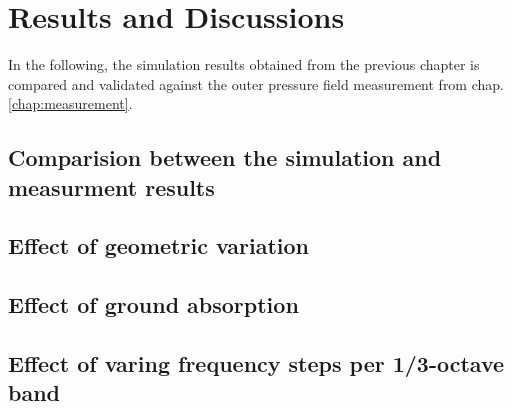\chapter{Results and Discussions}
\label{chap:results}

In the following, the simulation results obtained from the previous chapter is compared and validated against the outer pressure field measurement from chap. \ref{chap:measurement}.

\section{Comparision between the simulation and measurment results}

\section{Effect of geometric variation}

\section{Effect of ground absorption}

\section{Effect of varing frequency steps per 1/3-octave band}